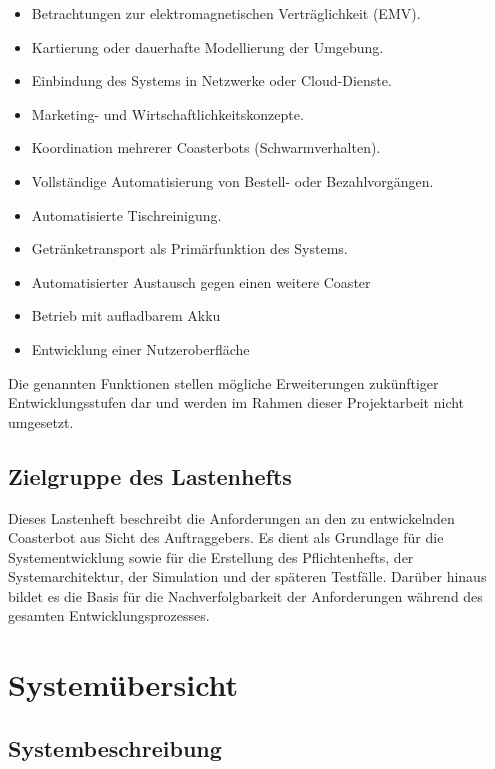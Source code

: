 \begin{itemize}
\tightlist
\item
  Betrachtungen zur elektromagnetischen Verträglichkeit (EMV).
\item
  Kartierung oder dauerhafte Modellierung der Umgebung.
\item
  Einbindung des Systems in Netzwerke oder Cloud-Dienste.
\item
  Marketing- und Wirtschaftlichkeitskonzepte.
\item
  Koordination mehrerer Coasterbots (Schwarmverhalten).
\item
  Vollständige Automatisierung von Bestell- oder Bezahlvorgängen.
\item
  Automatisierte Tischreinigung.
\item
  Getränketransport als Primärfunktion des Systems.
\item
  Automatisierter Austausch gegen einen weitere Coaster
\item
  Betrieb mit aufladbarem Akku
\item
  Entwicklung einer Nutzeroberfläche
\end{itemize}

Die genannten Funktionen stellen mögliche Erweiterungen zukünftiger
Entwicklungsstufen dar und werden im Rahmen dieser Projektarbeit nicht
umgesetzt.

\subsection{Zielgruppe des
Lastenhefts}\label{zielgruppe-des-lastenhefts}

Dieses Lastenheft beschreibt die Anforderungen an den zu entwickelnden
Coasterbot aus Sicht des Auftraggebers. Es dient als Grundlage für die
Systementwicklung sowie für die Erstellung des Pflichtenhefts, der
Systemarchitektur, der Simulation und der späteren Testfälle. Darüber
hinaus bildet es die Basis für die Nachverfolgbarkeit der Anforderungen
während des gesamten Entwicklungsprozesses.

\section{Systemübersicht}\label{systemuxfcbersicht}

\subsection{Systembeschreibung}\label{systembeschreibung}


